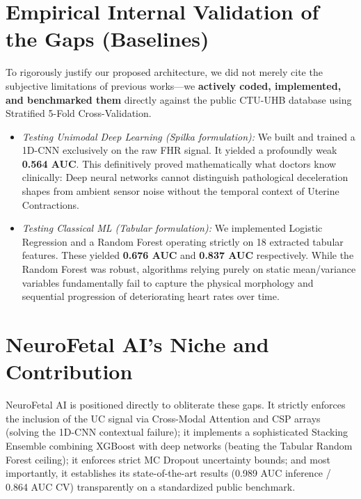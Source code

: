 \documentclass[12pt,a4paper]{report}
\begin{document}
\section{Empirical Internal Validation of the Gaps (Baselines)}
To rigorously justify our proposed architecture, we did not merely cite the subjective limitations of previous works---we \textbf{actively coded, implemented, and benchmarked them} directly against the public CTU-UHB database using Stratified 5-Fold Cross-Validation. 
\begin{itemize}
    \item \textit{Testing Unimodal Deep Learning (Spilka formulation):} We built and trained a 1D-CNN exclusively on the raw FHR signal. It yielded a profoundly weak \textbf{0.564 AUC}. This definitively proved mathematically what doctors know clinically: Deep neural networks cannot distinguish pathological deceleration shapes from ambient sensor noise without the temporal context of Uterine Contractions.
    \item \textit{Testing Classical ML (Tabular formulation):} We implemented Logistic Regression and a Random Forest operating strictly on 18 extracted tabular features. These yielded \textbf{0.676 AUC} and \textbf{0.837 AUC} respectively. While the Random Forest was robust, algorithms relying purely on static mean/variance variables fundamentally fail to capture the physical morphology and sequential progression of deteriorating heart rates over time.
\end{itemize}

\section{NeuroFetal AI's Niche and Contribution}
NeuroFetal AI is positioned directly to obliterate these gaps. It strictly enforces the inclusion of the UC signal via Cross-Modal Attention and CSP arrays (solving the 1D-CNN contextual failure); it implements a sophisticated Stacking Ensemble combining XGBoost with deep networks (beating the Tabular Random Forest ceiling); it enforces strict MC Dropout uncertainty bounds; and most importantly, it establishes its state-of-the-art results (0.989 AUC inference / 0.864 AUC CV) transparently on a standardized public benchmark.
\end{document}

